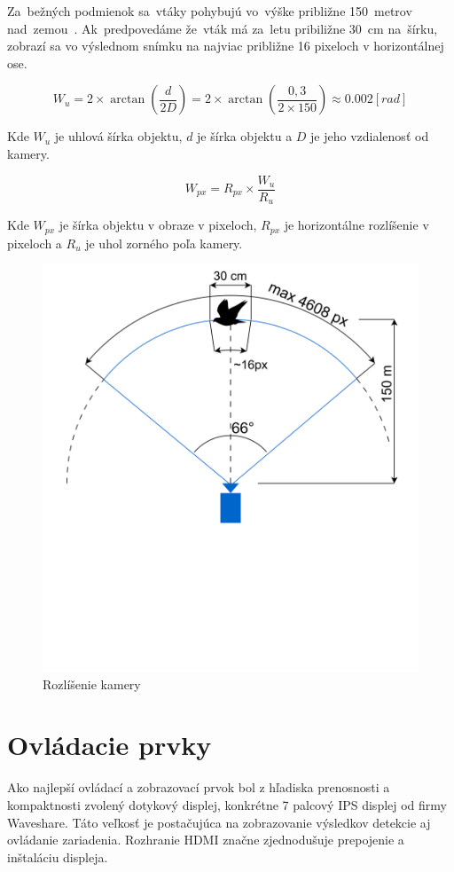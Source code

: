         Za~bežných podmienok sa~vtáky pohybujú vo~výške približne 150~metrov nad~zemou~\cite{Wood2011}. Ak~predpovedáme že~vták má za~letu pribiližne 30~cm na~šírku, zobrazí sa vo výslednom snímku na najviac približne 16 pixeloch v horizontálnej ose.

        \begin{equation}
            W_{u} = 2 \times \arctan(\frac{d}{2D}) = 2 \times \arctan(\frac{0,3}{2 \times 150}) \approx 0.002 [rad]
        \end{equation}
        
        Kde $W_{u}$ je uhlová šírka objektu, $d$ je šírka objektu a $D$ je jeho vzdialenosť od kamery.

        \begin{equation}
            W_{px} = R_{px} \times \frac{W_{u}}{R_{u}}
        \end{equation}

        Kde $W_{px}$ je šírka objektu v obraze v pixeloch, $R_{px}$ je horizontálne rozlíšenie v pixeloch a $R_{u}$ je uhol zorného poľa kamery.

        \begin{figure}[h]
            \centering
            \includegraphics[width=.6\textwidth]{obrazky/camera/fov.drawio.png}
            \caption{Rozlíšenie kamery}
        \end{figure}

    \section{Ovládacie prvky}

        Ako najlepší ovládací a zobrazovací prvok bol z hľadiska prenosnosti a kompaktnosti zvolený dotykový displej, konkrétne 7 palcový IPS displej od firmy Waveshare. Táto veľkosť je postačujúca na zobrazovanie výsledkov detekcie aj ovládanie zariadenia. Rozhranie HDMI značne zjednodušuje prepojenie a inštaláciu displeja.

